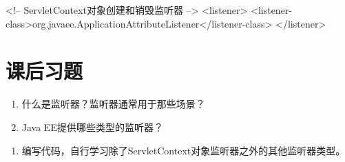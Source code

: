 
\begin{xmlCode}
  <!-- ServletContext对象创建和销毁监听器 -->
  <listener>
    <listener-class>org.javaee.ApplicationAttributeListener</listener-class>
  </listener> 
\end{xmlCode}


\section{课后习题}


\begin{enumerate}
\item 什么是监听器？监听器通常用于那些场景？
\item Java EE提供哪些类型的监听器？
\end{enumerate}


\begin{enumerate}
\item 编写代码，自行学习除了ServletContext对象监听器之外的其他监听器类型。
\end{enumerate}